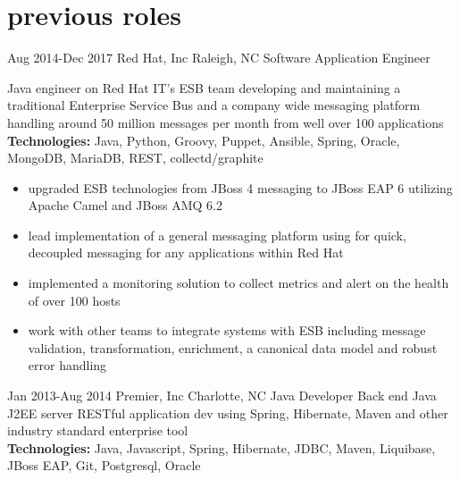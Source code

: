 
\section{previous roles}

\begin{entrylist}


\workentry
{Aug 2014-Dec 2017}
{Red Hat, Inc}
{Raleigh, NC}
{Software Application Engineer}
{Java engineer on Red Hat IT's ESB team developing and maintaining a traditional Enterprise Service Bus and a company wide messaging platform handling around 50 million messages per month from well over 100 applications \\
\textbf{Technologies:} Java, Python, Groovy, Puppet, Ansible, Spring, Oracle, MongoDB, MariaDB, REST, collectd/graphite
\begin{itemize}
\item upgraded ESB technologies from JBoss 4 messaging to JBoss EAP 6 utilizing Apache Camel and JBoss AMQ 6.2
\item lead implementation of a general messaging platform using for quick, decoupled messaging for any applications within Red Hat
\item implemented a monitoring solution to collect metrics and alert on the health of over 100 hosts
\item work with other teams to integrate systems with ESB including message validation, transformation, enrichment, a canonical data model and robust error handling
\end{itemize}}

\workentry
{Jan 2013-Aug 2014}
{Premier, Inc}
{Charlotte, NC}
{Java Developer}
{Back end Java J2EE server RESTful application dev using Spring, Hibernate, Maven and other industry standard enterprise tool \\
\textbf{Technologies:} Java, Javascript, Spring, Hibernate, JDBC, Maven, Liquibase, JBoss EAP, Git, Postgresql, Oracle}


\end{entrylist}
